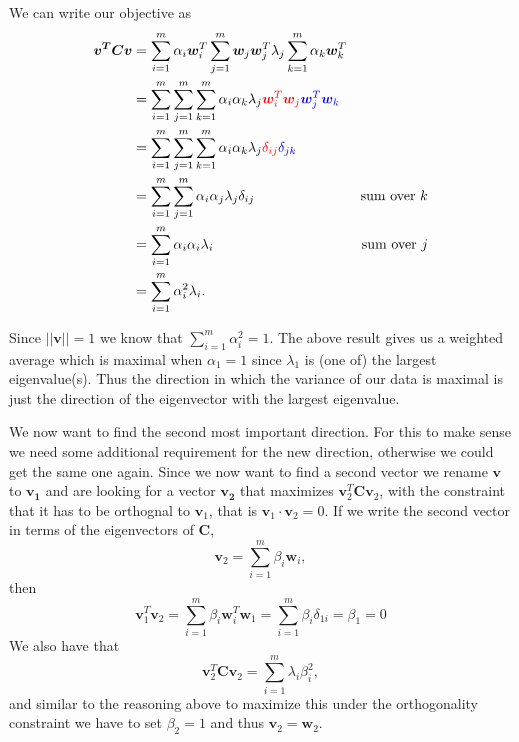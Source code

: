 We can write our objective as 
\begin{align}
    \bm{v^T} \bm{C v} &= \sum_{i=1}^m \alpha_i \bm{w}_i^T \sum_{j=1}^m \bm{w}_j\bm{w}_j^T \lambda_j \sum_{k=1}^m \alpha_k \bm{w}_k^T &\\
    &= \sum_{i=1}^m \sum_{j=1}^m \sum_{k=1}^m \alpha_{i} \alpha_{k} \lambda_{j} {\color{red} \bm{w}_i^T \bm{w}_j} {\color{blue} \bm{w}_j^T \bm{w}_k} &\\
    &= \sum_{i=1}^m \sum_{j=1}^m \sum_{k=1}^m \alpha_{i} \alpha_{k} \lambda_{j} {\color{red} \delta_{ij}} {\color{blue} \delta_{jk}}&\\
    &= \sum_{i=1}^m \sum_{j=1}^m  \alpha_{i} \alpha_{j} \lambda_{j} \delta_{ij} & \text{sum over $k$} \\ 
    &= \sum_{i=1}^m \alpha_{i} \alpha_{i} \lambda_{i}  & \text{sum over $j$} \\ 
    &= \sum_{i=1}^m \alpha_{i}^2 \lambda_{i}.
\end{align}

Since $||\bm{v}|| = 1$ we know that $\sum_{i=1}^m \alpha_i^2 = 1$. 
The above result gives us a weighted average which is maximal when $\alpha_1=1$ since $\lambda_1$ is (one of) the largest eigenvalue(s).
Thus the direction in which the variance of our data is maximal is just the direction of the eigenvector with the largest eigenvalue.

We now want to find the second most important direction. For this to make sense we need some additional requirement
for the new direction, otherwise we could get the same one again.
Since we now want to find a second vector we rename $\bm{v}$ to $\bm{v_1}$ and are looking for a 
vector $\bm{v_2}$ that maximizes $\bm{v}_2^T \bm{C} \bm{v}_2$, with the constraint that it has to be orthognal 
to $\bm{v}_1$, that is $\bm{v}_1 \cdot \bm{v}_2 = 0$.
If we write the second vector in terms of the eigenvectors of $\bm{C}$,
\begin{equation}
    \bm{v}_2 = \sum_{i=1}^m \beta_i \bm{w}_i,
\end{equation}
then 
\begin{equation}
    \bm{v}_1^T \bm{v}_2 = \sum_{i=1}^m \beta_i \bm{w}_i^T \bm{w}_1 = \sum_{i=1}^m \beta_i \delta_{1i} = \beta_1 = 0
\end{equation}
We also have that 
\begin{equation}
    \bm{v}_2^T \bm{C} \bm{v}_2 = \sum_{i=1}^m \lambda_i \beta_i^2,
\end{equation}
and similar to the reasoning above to maximize this under the orthogonality constraint
we have to set $\beta_2 = 1$ and thus $\bm{v}_2 = \bm{w}_2$.

